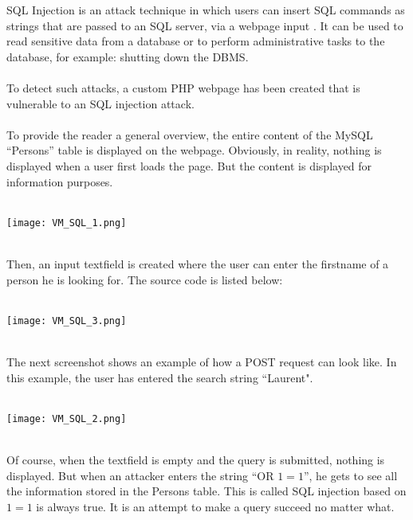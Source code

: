 SQL Injection is an attack technique in which users can insert SQL commands as strings that are passed to an SQL server, via a webpage input \citep{SQLInj}. It can be used to read sensitive data from a database or to perform administrative tasks to the database, for example: shutting down the DBMS. \\ \\
To detect such attacks, a custom PHP webpage has been created that is vulnerable to an SQL injection attack. \\ \\
To provide the reader a general overview, the entire content of the MySQL ``Persons'' table is displayed on the webpage. Obviously, in reality, nothing is displayed when a user first loads the page. But the content is displayed for information purposes.
$\;$ \\ \\
\noindent\begin{minipage}{\textwidth}
    \centering
    \texttt{[image: VM\_SQL\_1.png]}
\end{minipage}
$\;$ \\ \\
Then, an input textfield is created where the user can enter the firstname of a person he is looking for. The source code is listed below:
$\;$ \\ \\
\noindent\begin{minipage}{\textwidth}
    \centering
    \texttt{[image: VM\_SQL\_3.png]}
\end{minipage}
$\;$ \\ \\
The next screenshot shows an example of how a POST request can look like. In this example, the user has entered the search string ``Laurent".
$\;$ \\ \\
\noindent\begin{minipage}{\textwidth}
    \centering
    \texttt{[image: VM\_SQL\_2.png]}
\end{minipage}
$\;$ \\ \\
Of course, when the textfield is empty and the query is submitted, nothing is displayed. But when an attacker enters the string ``OR $1=1$'', he gets to see all the information stored in the Persons table. This is called SQL injection based on $1=1$ is always true. It is an attempt to make a query succeed no matter what.
